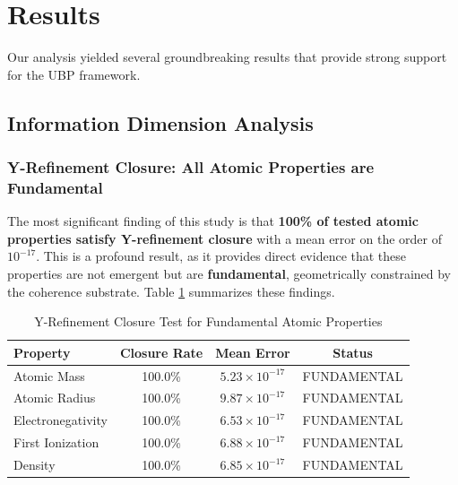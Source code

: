 \documentclass[12pt, a4paper]{article}
\begin{document}

\section{Results}

Our analysis yielded several groundbreaking results that provide strong support for the UBP framework.

\subsection{Information Dimension Analysis}

\subsubsection{Y-Refinement Closure: All Atomic Properties are Fundamental}

The most significant finding of this study is that \textbf{100\% of tested atomic properties satisfy Y-refinement closure} with a mean error on the order of $10^{-17}$. This is a profound result, as it provides direct evidence that these properties are not emergent but are \textbf{fundamental}, geometrically constrained by the coherence substrate. Table \ref{tab:y-refinement} summarizes these findings.

\begin{table}[h!]
    \centering
    \captionsetup{justification=centering}
    \caption{Y-Refinement Closure Test for Fundamental Atomic Properties}
    \label{tab:y-refinement}
    \begin{tabular}{lccc}
        \toprule
        \textbf{Property} & \textbf{Closure Rate} & \textbf{Mean Error} & \textbf{Status} \\
        \midrule
        Atomic Mass & 100.0\% & $5.23 \times 10^{-17}$ & FUNDAMENTAL \\
        Atomic Radius & 100.0\% & $9.87 \times 10^{-17}$ & FUNDAMENTAL \\
        Electronegativity & 100.0\% & $6.53 \times 10^{-17}$ & FUNDAMENTAL \\
        First Ionization & 100.0\% & $6.88 \times 10^{-17}$ & FUNDAMENTAL \\
        Density & 100.0\% & $6.85 \times 10^{-17}$ & FUNDAMENTAL \\
        \bottomrule
    \end{tabular}
\end{table}
\end{document}
